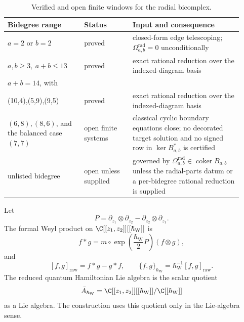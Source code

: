 \begin{table}[t]
\centering
\small
\begin{tabular}{@{}>{\raggedright\arraybackslash}p{0.30\linewidth}
  >{\raggedright\arraybackslash}p{0.19\linewidth}
  >{\raggedright\arraybackslash}p{0.43\linewidth}@{}}
\toprule
\textbf{Bidegree range} & \textbf{Status} & \textbf{Input and consequence} \\
\midrule
\(a=2\) or \(b=2\) &
proved &
closed-form edge telescoping; \(\Omega^{\mathrm{rad}}_{a,b}=0\) unconditionally \\
\(a,b\ge3,\ a+b\le13\) &
proved &
exact rational reduction over the indexed-diagram basis \\
\(a+b=14\), with
\(\begin{gathered}
(3,11),(11,3),(4,10),\\
(10,4),(5,9),(9,5)
\end{gathered}\) &
proved &
exact rational reduction over the indexed-diagram basis \\
\((6,8),(8,6)\), and the balanced case \((7,7)\) &
open finite systems &
classical cyclic boundary equations close; no decorated target solution
and no signed row in \(\ker B_{a,b}^*\) is certified \\
unlisted bidegree &
open unless supplied &
governed by
\(\Omega^{\mathrm{rad}}_{a,b}\in\operatorname{coker}B_{a,b}\)
unless the radial-parts datum or a per-bidegree rational reduction is supplied \\
\bottomrule
\end{tabular}
\caption{Verified and open finite windows for the radial bicomplex.}
\label{tab:app-radial-finite-window-status}
\end{table}

\begin{defn}
\label{def:app-radial-moyal-convention}
  Let
  \[
    P=\partial_{z_1}\otimes\partial_{z_2}
      -\partial_{z_2}\otimes\partial_{z_1}.
  \]
  The formal Weyl product on \(\C[[z_1,z_2]][[\hbar_{\mathrm{W}}]]\) is
  \[
    f*g=m\circ\exp\left(\frac{\hbar_{\mathrm{W}}}{2}P\right)(f\otimes g),
  \]
  and
  \[
    [f,g]_{\mathrm{raw}}=f*g-g*f,\qquad
    \{f,g\}_{\hbar_{\mathrm{W}}}=\hbar_{\mathrm{W}}^{-1}[f,g]_{\mathrm{raw}}.
  \]
  The reduced quantum Hamiltonian Lie algebra is the scalar quotient
  \[
    \bar A_{\hbar_{\mathrm{W}}}=\C[[z_1,z_2]][[\hbar_{\mathrm{W}}]]/\C[[\hbar_{\mathrm{W}}]]
  \]
  as a Lie algebra.  The construction uses this quotient only in the
  Lie-algebra sense.
\end{defn}

